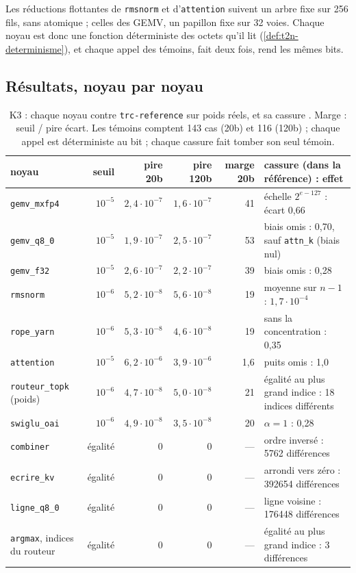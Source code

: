 Les réductions flottantes de \texttt{rmsnorm} et d'\texttt{attention} suivent un arbre fixe sur 256 fils, sans atomique ; celles des GEMV, un papillon fixe sur 32 voies. Chaque noyau est donc une fonction déterministe des octets qu'il lit (\cref{def:t2n-determinisme}), et chaque appel des témoins, fait deux fois, rend les mêmes bits.

\subsection{Résultats, noyau par noyau}

\begin{table}[!htbp]
\centering\small
\caption[K3 : les douze noyaux contre la référence f64]{K3 : chaque noyau contre \texttt{trc-reference} sur poids réels, et sa cassure \mes. Marge : seuil / pire écart. Les témoins comptent 143 cas (20b) et 116 (120b) ; chaque appel est déterministe au bit ; chaque cassure fait tomber son seul témoin.}
\label{tab:t2n-k3}
\footnotesize
\begin{tabularx}{\linewidth}{@{}lrrrrX@{}}
\toprule
noyau & seuil & pire 20b & pire 120b & marge 20b & cassure (dans la référence) : effet \\
\midrule
\texttt{gemv\_mxfp4} & $10^{-5}$ & $2{,}4\cdot10^{-7}$ & $1{,}6\cdot10^{-7}$ & 41 & échelle $2^{e-127}$ : écart 0,66 \\
\texttt{gemv\_q8\_0} & $10^{-5}$ & $1{,}9\cdot10^{-7}$ & $2{,}5\cdot10^{-7}$ & 53 & biais omis : 0,70, sauf \texttt{attn\_k} (biais nul) \\
\texttt{gemv\_f32} & $10^{-5}$ & $2{,}6\cdot10^{-7}$ & $2{,}2\cdot10^{-7}$ & 39 & biais omis : 0,28 \\
\texttt{rmsnorm} & $10^{-6}$ & $5{,}2\cdot10^{-8}$ & $5{,}6\cdot10^{-8}$ & 19 & moyenne sur $n - 1$ : $1{,}7\cdot10^{-4}$ \\
\texttt{rope\_yarn} & $10^{-6}$ & $5{,}3\cdot10^{-8}$ & $4{,}6\cdot10^{-8}$ & 19 & sans la concentration : 0,35 \\
\texttt{attention} & $10^{-5}$ & $6{,}2\cdot10^{-6}$ & $3{,}9\cdot10^{-6}$ & 1,6 & puits omis : 1,0 \\
\texttt{routeur\_topk} (poids) & $10^{-6}$ & $4{,}7\cdot10^{-8}$ & $5{,}0\cdot10^{-8}$ & 21 & égalité au plus grand indice : 18 indices différents \\
\texttt{swiglu\_oai} & $10^{-6}$ & $4{,}9\cdot10^{-8}$ & $3{,}5\cdot10^{-8}$ & 20 & $\alpha = 1$ : 0,28 \\
\texttt{combiner} & égalité & 0 & 0 & — & ordre inversé : \num{5762} différences \\
\texttt{ecrire\_kv} & égalité & 0 & 0 & — & arrondi vers zéro : \num{392654} différences \\
\texttt{ligne\_q8\_0} & égalité & 0 & 0 & — & ligne voisine : \num{176448} différences \\
\texttt{argmax}, indices du routeur & égalité & 0 & 0 & — & égalité au plus grand indice : 3 différences \\
\bottomrule
\end{tabularx}
\end{table}

